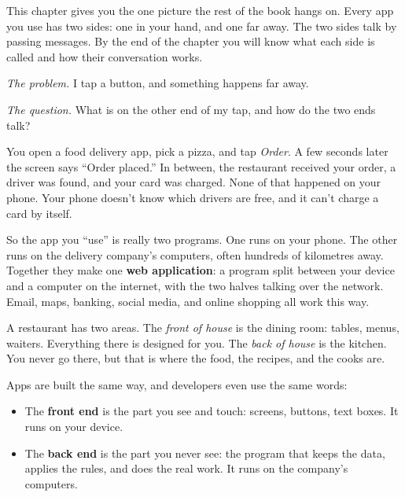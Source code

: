 \label{ch:webapp-01}

\chapterrule

This chapter gives you the one picture the rest of the book hangs on. Every app you use has two sides: one in your hand, and one far away. The two sides talk by passing messages. By the end of the chapter you will know what each side is called and how their conversation works.

\emph{The problem.} I tap a button, and something happens far away.

\emph{The question.} What is on the other end of my tap, and how do the two ends talk?

\label{webapp-01:one-app-two-places}

You open a food delivery app, pick a pizza, and tap \emph{Order}. A few seconds later the screen says ``Order placed.'' In between, the restaurant received your order, a driver was found, and your card was charged. None of that happened on your phone. Your phone doesn't know which drivers are free, and it can't charge a card by itself.

So the app you ``use'' is really two programs. One runs on your phone. The other runs on the delivery company's computers, often hundreds of kilometres away. Together they make one \textbf{web application}: a program split between your device and a computer on the internet, with the two halves talking over the network. Email, maps, banking, social media, and online shopping all work this way.

\label{webapp-01:the-restaurant-picture}

A restaurant has two areas. The \emph{front of house} is the dining room: tables, menus, waiters. Everything there is designed for you. The \emph{back of house} is the kitchen. You never go there, but that is where the food, the recipes, and the cooks are.

Apps are built the same way, and developers even use the same words:

\begin{itemize}
\tightlist
\item
  The \textbf{front end} is the part you see and touch: screens, buttons, text boxes. It runs on your device.
\item
  The \textbf{back end} is the part you never see: the program that keeps the data, applies the rules, and does the real work. It runs on the company's computers.
\end{itemize}

